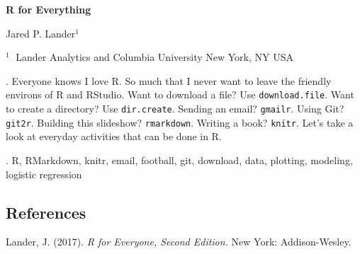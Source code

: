 \documentclass[12pt]{article}
\begin{document}
\begin{flushleft}


{\LARGE\bf R for Everything}


\vspace{1.0cm}

Jared P. Lander$^1$

\begin{description}

\item $^1 \;$ Lander Analytics and Columbia University
New York, NY USA

\end{description}

\end{flushleft}


\vspace{0.95cm}

. Everyone knows I love R. So much that I never want to leave the friendly environs of R and RStudio. Want to download a file? Use \texttt{download.file}. Want to create a directory? Use \texttt{dir.create}. Sending an email? \texttt{gmailr}. Using Git? \texttt{git2r}. Building this slideshow? \texttt{rmarkdown}. Writing a book? \texttt{knitr}. Let's take a look at everyday activities that can be done in R.

\vskip 2mm

.
R, RMarkdown, knitr, email, football, git, download, data, plotting, modeling, logistic regression

\subsection*{References}

\begin{description}

\item
Lander, J. (2017).
\textit{R for Everyone, Second Edition.}
New York: Addison-Wesley.

\end{description}
\end{document}
